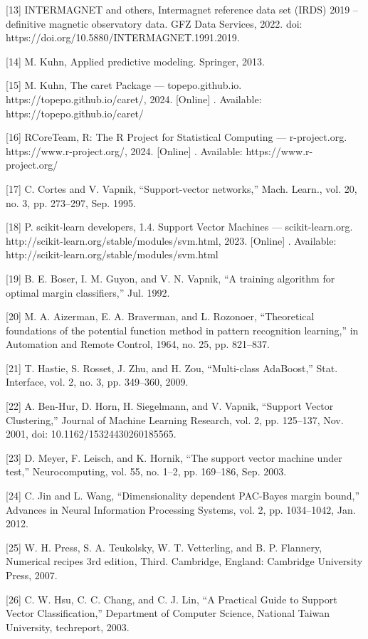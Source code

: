 \documentclass[sn-mathphys-num]{sn-jnl}%
\begin{document}
[13] INTERMAGNET and others, Intermagnet reference data set (IRDS) 2019 – definitive magnetic observatory data. GFZ Data Services, 2022. doi: https://doi.org/10.5880/INTERMAGNET.1991.2019.

[14] M. Kuhn, Applied predictive modeling. Springer, 2013.

[15] M. Kuhn, The caret Package — topepo.github.io. https://topepo.github.io/caret/, 2024. [Online] . Available: https://topepo.github.io/caret/

[16] RCoreTeam, R: The R Project for Statistical Computing — r-project.org. https://www.r-project.org/, 2024. [Online] . Available: https://www.r-project.org/

[17] C. Cortes and V. Vapnik, “Support-vector networks,” Mach. Learn., vol. 20, no. 3, pp. 273–297, Sep. 1995.

[18] P. scikit-learn developers, 1.4. Support Vector Machines — scikit-learn.org. http://scikit-learn.org/stable/modules/svm.html, 2023. [Online] . Available: http://scikit-learn.org/stable/modules/svm.html

[19] B. E. Boser, I. M. Guyon, and V. N. Vapnik, “A training algorithm for optimal margin classifiers,” Jul. 1992.

[20] M. A. Aizerman, E. A. Braverman, and L. Rozonoer, “Theoretical foundations of the potential function method in pattern recognition learning,” in Automation and Remote Control, 1964, no. 25, pp. 821–837.

[21] T. Hastie, S. Rosset, J. Zhu, and H. Zou, “Multi-class AdaBoost,” Stat. Interface, vol. 2, no. 3, pp. 349–360, 2009.

[22] A. Ben-Hur, D. Horn, H. Siegelmann, and V. Vapnik, “Support Vector Clustering,” Journal of Machine Learning Research, vol. 2, pp. 125–137, Nov. 2001, doi: 10.1162/15324430260185565.

[23] D. Meyer, F. Leisch, and K. Hornik, “The support vector machine under test,” Neurocomputing, vol. 55, no. 1–2, pp. 169–186, Sep. 2003.

[24] C. Jin and L. Wang, “Dimensionality dependent PAC-Bayes margin bound,” Advances in Neural Information Processing Systems, vol. 2, pp. 1034–1042, Jan. 2012.

[25] W. H. Press, S. A. Teukolsky, W. T. Vetterling, and B. P. Flannery, Numerical recipes 3rd edition, Third. Cambridge, England: Cambridge University Press, 2007.

[26] C. W. Hsu, C. C. Chang, and C. J. Lin, “A Practical Guide to Support Vector Classification,” Department of Computer Science, National Taiwan University, techreport, 2003.
\end{document}
